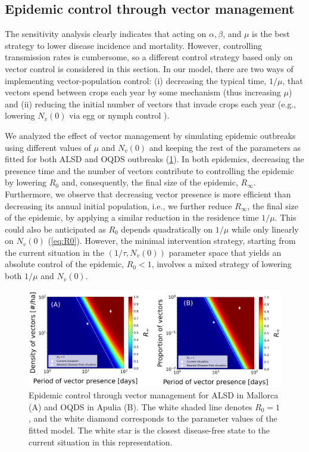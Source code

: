 \subsection{Epidemic control through vector management}

The sensitivity analysis clearly indicates that acting on $\alpha,\beta$,
and $\mu$ is the best strategy to lower disease incidence and mortality.
However, controlling transmission rates is cumbersome, so a different control
strategy based only on vector control is considered in this section. In our
model, there are two ways of implementing vector-population control: (i)
decreasing the typical time, $1/\mu$, that vectors spend between crops each
year by some mechanism (thus increasing $\mu$) and (ii) reducing the initial
number of vectors that invade crops each year (e.g., lowering $N_v(0)$ via egg
or nymph control \cite{Lago2023}).

We analyzed the effect of vector management by simulating epidemic
outbreaks using different values of $\mu$ and $N_v(0)$ and keeping the rest of
the parameters as fitted for both ALSD and OQDS outbreaks
(\cref{fig:control_strategy}). In both epidemics, decreasing the presence time
and the number of vectors contribute to controlling the epidemic by
lowering $R_0$ and, consequently, the final size of the epidemic, $R_{\infty}$.
Furthermore, we observe that decreasing vector presence is more efficient than
decreasing its annual initial population, i.e., we further reduce $R_{\infty}$,
the final size of the epidemic, by applying a similar reduction in the
residence time $1/\mu$. This could also be anticipated as $R_0$ depends
quadratically on $1/\mu$ while only linearly on $N_v(0)$ (\cref{eq:R0}).
However, the minimal intervention strategy, starting from the current situation
in the $(1/\tau,N_v(0))$ parameter space that yields an absolute control of the
epidemic, $R_0<1$, involves a mixed strategy of lowering both $1/\mu$ and
$N_v(0)$.

\begin{figure}[H]
    \centering
    \includegraphics[width=\textwidth]{Figures/Control_strategy.png}
    \caption[Epidemic control through vector management for ALSD in Mallorca
        and
        OQDS in Apulia]{Epidemic control through vector management for ALSD in
        Mallorca (A) and OQDS in Apulia (B). The white shaded line denotes
        $R_0=1$, and the white diamond corresponds to the parameter values of
        the fitted model. The white star is the closest disease-free state to
        the current situation in this representation.}
    \label{fig:control_strategy}
\end{figure}

